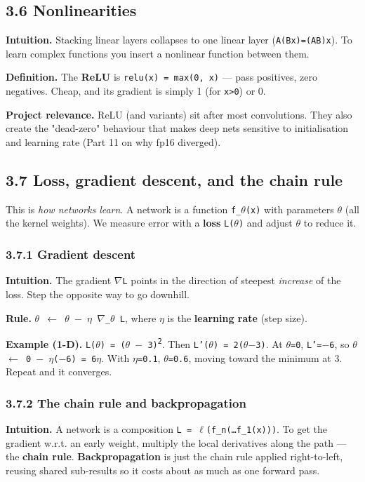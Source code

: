 \documentclass[11pt]{article}
\begin{document}
\subsection*{3.6 Nonlinearities}

\textbf{Intuition.} Stacking linear layers collapses to one linear layer (\texttt{A(Bx)=(AB)x}). To learn complex functions you insert a nonlinear function between them.

\textbf{Definition.} The \textbf{ReLU} is \texttt{relu(x) = max(0, x)} --- pass positives, zero negatives. Cheap, and its gradient is simply 1 (for \texttt{x>0}) or 0.

\textbf{Project relevance.} ReLU (and variants) sit after most convolutions. They also create the "dead-zero" behaviour that makes deep nets sensitive to initialisation and learning rate (Part 11 on why fp16 diverged).

\subsection*{3.7 Loss, gradient descent, and the chain rule}

This is \textit{how networks learn}. A network is a function \texttt{f\_$\theta$(x)} with parameters \texttt{$\theta$} (all the kernel weights). We measure error with a \textbf{loss} \texttt{L($\theta$)} and adjust \texttt{$\theta$} to reduce it.

\subsubsection*{3.7.1 Gradient descent}
\textbf{Intuition.} The gradient \texttt{$\nabla$L} points in the direction of steepest \textit{increase} of the loss. Step the opposite way to go downhill.

\textbf{Rule.} \texttt{$\theta$ $\leftarrow$ $\theta$ $-$ $\eta$ $\nabla$\_$\theta$ L}, where \texttt{$\eta$} is the \textbf{learning rate} (step size).

\textbf{Example (1-D).} \texttt{L($\theta$) = ($\theta$ $-$ 3)\textsuperscript{2}}. Then \texttt{L'($\theta$) = 2($\theta$$-$3)}. At \texttt{$\theta$=0}, \texttt{L'=$-$6}, so \texttt{$\theta$ $\leftarrow$ 0 $-$ $\eta$($-$6) = 6$\eta$}. With \texttt{$\eta$=0.1}, \texttt{$\theta$=0.6}, moving toward the minimum at 3. Repeat and it converges.

\subsubsection*{3.7.2 The chain rule and backpropagation}
\textbf{Intuition.} A network is a composition \texttt{L = $\ell$(f\_n(\ldots{}f\_1(x)))}. To get the gradient w.r.t. an early weight, multiply the local derivatives along the path --- the \textbf{chain rule}. \textbf{Backpropagation} is just the chain rule applied right-to-left, reusing shared sub-results so it costs about as much as one forward pass.
\end{document}
